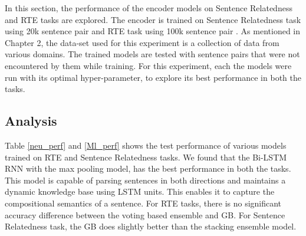 \documentclass[12pt]{report} %
\begin{document}
\label{performance}

In this section, the performance of the encoder models on Sentence Relatedness and RTE tasks are explored. The encoder is trained on Sentence Relatedness task using 20k sentence pair \citep{cer2017semeval} and RTE task using 100k sentence pair \citep{bowman2015large}. As mentioned in Chapter 2, the data-set used for this experiment is a collection of data from various domains. The trained models are tested with sentence pairs that were not encountered by them while training. For this experiment, each the models were run with its optimal hyper-parameter, to explore its best performance in both the tasks. 




\subsection{Analysis}

Table \ref{neu_perf} and \ref{Ml_perf} shows the test performance of various models trained on RTE and Sentence Relatedness tasks. We found that the Bi-LSTM RNN with the max pooling model, has the best performance in both the tasks. This model is capable of parsing sentences in both directions and maintains a dynamic knowledge base using LSTM units. This enables it to capture the compositional semantics of a sentence. For RTE tasks, there is no significant accuracy difference between the voting based ensemble and GB. For Sentence Relatedness task, the GB does slightly better than the stacking ensemble model.
\end{document}
